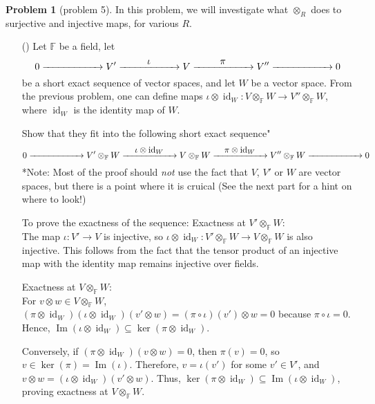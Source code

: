 \documentclass[12pt]{article}
\theoremstyle{definition}
\newtheorem{problem}{Problem}
\newcounter{subq}[problem]
\newenvironment{subproblem}
{\refstepcounter{subq} \begin{itemize} \item[(\alph{subq})]}
{\end{itemize} \medskip}
\DeclareMathOperator{\id}{id}
\begin{document}
\begin{problem}[problem 5]
    In this problem, we will investigate what $\otimes_R$ does to surjective and injective maps, for various $R$.

    \begin{subproblem}
        Let $\mathbb{F}$ be a field, let
        \[
            0 \xrightarrow{\makebox[2cm]{}} V' \xrightarrow{\makebox[2cm]{$\iota$}} V \xrightarrow{\makebox[2cm]{$\pi$}} V'' \xrightarrow{\makebox[2cm]{}} 0
        \]
        be a short exact sequence of vector spaces, and let $W$ be a vector space. From the previous problem, one can define maps
        $\iota \otimes \id_W : V \otimes_{\mathbb{F}} W \longrightarrow V'' \otimes_{\mathbb{F}} W$, where $\id_W$ is the identity map of $W$.

        Show that they fit into the following short exact sequence" 
        \[
            0 \xrightarrow{\makebox[2cm]{}} V' \otimes_{\mathbb{F}} W \xrightarrow{\makebox[2cm]{$\iota \otimes \id_W$}} V \otimes_{\mathbb{F}} W \xrightarrow{\makebox[2cm]{$\pi \otimes \id_W$}} V'' \otimes_{\mathbb{F}} W \xrightarrow{\makebox[2cm]{}} 0
        \]
        *Note: Most of the proof should \textit{not} use the fact that $V$, $V'$ or $W$ are vector spaces, but there is a point where it is cruical
        (See the next part for a hint on where to look!)

        \begin{solution}
            To prove the exactness of the sequence:
            Exactness at \( V' \otimes_{\mathbb{F}} W \):\\
                The map \( \iota: V' \to V \) is injective, so \( \iota \otimes \id_W: V' \otimes_{\mathbb{F}} W \to V \otimes_{\mathbb{F}} W \) is also injective. This follows from the fact that the tensor product of an injective map with the identity map remains injective over fields.

            Exactness at \( V \otimes_{\mathbb{F}} W \):\\
                For \( v \otimes w \in V \otimes_{\mathbb{F}} W \), \( (\pi \otimes \id_W)(\iota \otimes \id_W)(v' \otimes w) = (\pi \circ \iota)(v') \otimes w = 0 \) because \( \pi \circ \iota = 0 \). Hence, \( \operatorname{Im}(\iota \otimes \id_W) \subseteq \ker(\pi \otimes \id_W) \).

                Conversely, if \( (\pi \otimes \id_W)(v \otimes w) = 0 \), then \( \pi(v) = 0 \), so \( v \in \ker(\pi) = \operatorname{Im}(\iota) \). Therefore, \( v = \iota(v') \) for some \( v' \in V' \), and \( v \otimes w = (\iota \otimes \id_W)(v' \otimes w) \). Thus, \( \ker(\pi \otimes \id_W) \subseteq \operatorname{Im}(\iota \otimes \id_W) \), proving exactness at \( V \otimes_{\mathbb{F}} W \).


\end{solution}
\end{subproblem}
\end{problem}
\end{document}
